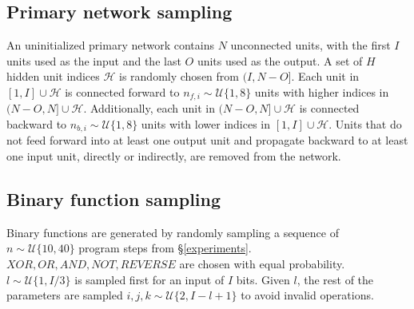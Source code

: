\documentclass{article}[12px]
\begin{document}
\subsection{Primary network sampling}

An uninitialized primary network contains \(N\) unconnected units, with the first \(I\) units used as the input and the last \(O\) units used as the output. A set of \(H\) hidden unit indices \(\mathcal{H}\) is randomly chosen from \((I, N - O]\). Each unit in \([1, I] \cup \mathcal{H}\) is connected forward to \(n_{f, i} \sim \mathcal{U}\{1, 8\}\) units with higher indices in \((N - O, N] \cup \mathcal{H}\). Additionally, each unit in \((N - O, N] \cup \mathcal{H}\) is connected backward to \(n_{b,i} \sim \mathcal{U}\{1, 8\}\) units with lower indices in \([1, I] \cup \mathcal{H}\). Units that do not feed forward into at least one output unit and propagate backward to at least one input unit, directly or indirectly, are removed from the network.

\subsection{Binary function sampling}

Binary functions are generated by randomly sampling a sequence of \(n \sim \mathcal{U}\{10, 40\}\) program steps from \S \ref{experiments}. \(XOR, OR, AND, NOT, REVERSE\) are chosen with equal probability. \(l \sim \mathcal{U}\{1, {I/3}\}\) is sampled first for an input of \(I\) bits. Given \(l\), the rest of the parameters are sampled \(i, j, k \sim \mathcal{U}\{2, I-l+1\}\) to avoid invalid operations.
\end{document}

